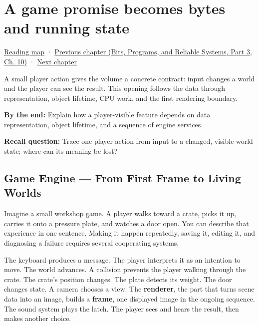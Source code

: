 \chapter{A game promise becomes bytes and running state}\label{05-engine-i-ch001-a-game-promise-becomes-bytes-and-running-state}\hypertarget{05-engine-i-ch001}{}\label{stagechapter:05-engine-i-ch001}

\hypertarget{05-engine-i-ch001-a-game-promise-becomes-bytes-and-running-state}{}

\hyperref[volume-reading-map]{Reading map} · \href{../01-Bits-Programs-and-Reliable-Systems-P03/main.pdf\#01-foundations-i-ch012}{Previous chapter (Bits, Programs, and Reliable Systems, Part 3, Ch. 10)} · \hyperref[05-engine-i-ch002-how-bytes-become-programs-objects-and-resource-references]{Next chapter}

A small player action gives the volume a concrete contract: input changes a world and the player can see the result. This opening follows the data through representation, object lifetime, CPU work, and the first rendering boundary.

\textbf{By the end:} Explain how a player-visible feature depends on data representation, object lifetime, and a sequence of engine services.

\textbf{Recall question:} Trace one player action from input to a changed, visible world state; where can its meaning be lost?

\section{Game Engine --- From First Frame to Living Worlds}\label{05-engine-i-ch001-game-engine-from-first-frame-to-living-worlds}

\hypertarget{05-engine-i-ch001-game-engine-from-first-frame-to-living-worlds}{}

Imagine a small workshop game. A player walks toward a crate, picks it up, carries it onto a pressure plate, and watches a door open. You can describe that experience in one sentence. Making it happen repeatedly, saving it, editing it, and diagnosing a failure requires several cooperating systems.

The keyboard produces a message. The player interprets it as an intention to move. The world advances. A collision prevents the player walking through the crate. The crate's position changes. The plate detects its weight. The door changes state. A camera chooses a view. The \textbf{renderer}, the part that turns scene data into an image, builds a \textbf{frame}, one displayed image in the ongoing sequence. The sound system plays the latch. The player sees and hears the result, then makes another choice.

